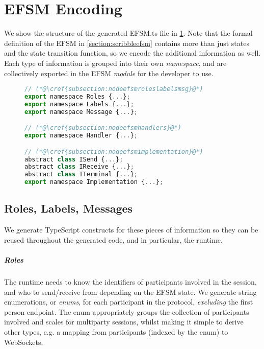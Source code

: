 \section{EFSM Encoding}
\label{section:nodeefsm}

We show the structure of the generated EFSM.ts file in
\cref{lst:nodeefsmfile}.
Note that the formal definition of the EFSM in 
\cref{section:scribbleefsm}
contains more than just states and the state transition function,
so we encode the additional information as well.
Each type of information is grouped into their own
\textit{namespace}, and are collectively exported in
the EFSM \textit{module} for the developer to use.

\begin{figure}
\begin{lstlisting}[language=javascript,tabsize=2,title=EFSM.ts]
// (*@\cref{subsection:nodeefsmroleslabelsmsg}@*)
export namespace Roles {...};
export namespace Labels {...};
export namespace Message {...};

// (*@\cref{subsection:nodeefsmhandlers}@*)
export namespace Handler {...};

// (*@\cref{subsection:nodeefsmimplementation}@*)
abstract class ISend {...};
abstract class IReceive {...};
abstract class ITerminal {...};
export namespace Implementation {...};
\end{lstlisting}
\label{lst:nodeefsmfile}
\end{figure}

\subsection{Roles, Labels, Messages}
\label{subsection:nodeefsmroleslabelsmsg}

We generate TypeScript constructs for these pieces of information
so they can be reused throughout the generated code, 
and in particular, the runtime.

\subparagraph{Roles}
The runtime needs to know the identifiers of participants involved
in the session, and who to send/receive from 
depending on the EFSM state.
We generate string enumerations, or \textit{enums}, for each 
participant in the protocol, \textit{excluding} the 
first person endpoint. 
The enum appropriately groups the collection
of participants involved and scales for multiparty sessions,
whilst making it simple to derive other types, e.g. a mapping from
participants (indexed by the enum) to WebSockets.

